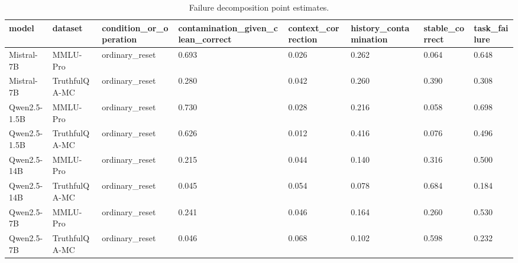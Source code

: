 \begin{table}
\caption{Failure decomposition point estimates.}
\label{tab:failure-decomposition-compact}
\begin{tabular}{llllllll}
\toprule
model & dataset & condition\_or\_operation & contamination\_given\_clean\_correct & context\_correction & history\_contamination & stable\_correct & task\_failure \\
\midrule
Mistral-7B & MMLU-Pro & ordinary\_reset & 0.693 & 0.026 & 0.262 & 0.064 & 0.648 \\
Mistral-7B & TruthfulQA-MC & ordinary\_reset & 0.280 & 0.042 & 0.260 & 0.390 & 0.308 \\
Qwen2.5-1.5B & MMLU-Pro & ordinary\_reset & 0.730 & 0.028 & 0.216 & 0.058 & 0.698 \\
Qwen2.5-1.5B & TruthfulQA-MC & ordinary\_reset & 0.626 & 0.012 & 0.416 & 0.076 & 0.496 \\
Qwen2.5-14B & MMLU-Pro & ordinary\_reset & 0.215 & 0.044 & 0.140 & 0.316 & 0.500 \\
Qwen2.5-14B & TruthfulQA-MC & ordinary\_reset & 0.045 & 0.054 & 0.078 & 0.684 & 0.184 \\
Qwen2.5-7B & MMLU-Pro & ordinary\_reset & 0.241 & 0.046 & 0.164 & 0.260 & 0.530 \\
Qwen2.5-7B & TruthfulQA-MC & ordinary\_reset & 0.046 & 0.068 & 0.102 & 0.598 & 0.232 \\
\bottomrule
\end{tabular}
\end{table}
